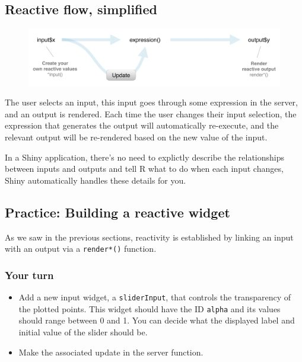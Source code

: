 \documentclass[
  letterpaper,
  DIV=11,
  numbers=noendperiod]{scrreprt}
\begin{document}
\hypertarget{reactive-flow-simplified}{%
\subsection{Reactive flow, simplified}\label{reactive-flow-simplified}}

\begin{figure}

{\centering \includegraphics[width=1\textwidth,height=\textheight]{./images/reactive-flow-simple.png}

}

\end{figure}

The user selects an input, this input goes through some expression in
the server, and an output is rendered. Each time the user changes their
input selection, the expression that generates the output will
automatically re-execute, and the relevant output will be re-rendered
based on the new value of the input.

In a Shiny application, there's no need to explictly describe the
relationships between inputs and outputs and tell R what to do when each
input changes, Shiny automatically handles these details for you.

\hypertarget{practice-building-a-reactive-widget}{%
\subsection{Practice: Building a reactive
widget}\label{practice-building-a-reactive-widget}}

As we saw in the previous sections, reactivity is established by linking
an input with an output via a \texttt{render*()} function.

\hypertarget{your-turn-4}{%
\subsubsection{Your turn}\label{your-turn-4}}

\begin{itemize}
\item
  Add a new input widget, a \texttt{sliderInput}, that controls the
  transparency of the plotted points. This widget should have the ID
  \texttt{alpha} and its values should range between 0 and 1. You can
  decide what the displayed label and initial value of the slider should
  be.
\item
  Make the associated update in the server function.
\end{itemize}
\end{document}
